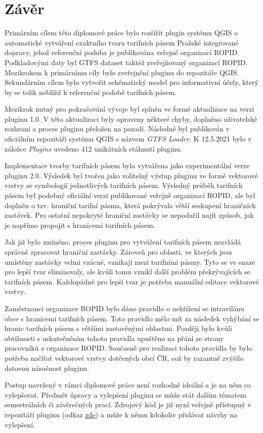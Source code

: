 \chapter*{Závěr}
\label{6-zaver}

Primárním cílem této diplomové práce bylo rozšířit plugin systému QGIS 
o automa\-tické vytváření exaktního tvaru tarifních pásem Pražské integrované dopravy, 
jehož referenční podoba je publikována veřejně organizací ROPID.  
Podkladovými daty byl GTFS dataset taktéž zveřejňovaný organizací ROPID.
Mezikrokem k primárnímu cíly bylo zveřejnění pluginu do repozitáře QGIS. Sekundárním cílem bylo vytvořit schématický model pro 
informativní účely, který by se tolik neblížil k referenční podobě tarifních pásem.

Mezikrok nutný pro pokračování vývoje byl splněn ve formě aktualizace na verzi pluginu 1.0.
V této aktualizaci byly opraveny některé chyby, doplněno uživatelské rozhraní a proces pluginu přeložen na pozadí. 
Následné byl publikován v oficiálním repozitáři systému QGIS s názvem \textit{GTFS Loader}. 
K 12.5.2021 bylo v záložce \textit{Plugins} uvedeno 412 unikátních stáhnutí pluginu.

Implementace tvorby tarifních pásem byla vytvářena jako experimentální verze pluginu 2.0. Výsledek
byl tvořen jako volitelný výstup pluginu ve formě vektorové vrstvy se symbologií jednotlivých tarifních pásem.
Výsledný průběh tarifních pásem byl podobný oficiální verzi publikované veřejně organizací ROPID, ale byl doplněn o tzv. hraniční tarifní pásma,
která pokrývala větší seskupení hraničních zastávek. Pro ostatní nepokryté hraniční zastávky 
se nepodařil najít způsob, jak je napřímo propojit s hranicemi tarifních pásem.

Jak již bylo zmíněno, proces pluginu pro vytváření tarifních pásem nezvládá správně zpracovat hraniční zastávky.
Zároveň pro oblasti, ve kterých jsou umístěny zastávky velmi vzácně, vznikají  mezi tarifními pásmy.
Tyto  se ve snaze pro lepší tvar eliminovaly, ale kvůli tomu vznikl další problém překrývajících se tarifních pásem.
Každopádně pro lepší tvar je potřeba manuální editace vektorové vrstvy.

Zaměstnanci organizace ROPID bylo dáno pravidlo o nekřížení se intravilánu obce s hranicemi tarifních pásem.
Toto pravidlo mělo mít za následek vyhýbání se hranic tarifních pásem s většími zastavěnými oblastmi.
Později bylo kvůli obtížnosti s uskutečněním tohoto pravidla upuštěno na přání ze strany pracovníků z organizace ROPID.
Současně pro realizaci tohoto pravidla by bylo potřeba načítat vektorové vrstvy
dotčených obcí ČR, což by razantně zvýšilo datovou náročnost pluginu.

Postup navržený v rámci diplomové práce není rozhodně ideální a je na něm co vylepšovat. Předmět úpravy a vylepšení pluginu
se může stát dalším tématem semestrálních či závěrečných prací. Zdrojový kód
je již nyní veřejně přístupný v repozitáři pluginu (odkaz \href{https://github.com/ctu-geoforall-lab/qgis-gtfs-plugin/tree/pid\_zones}
{\underline{zde}}) a může k němu kdokoliv přidávat
návrhy na vylepšení.  

